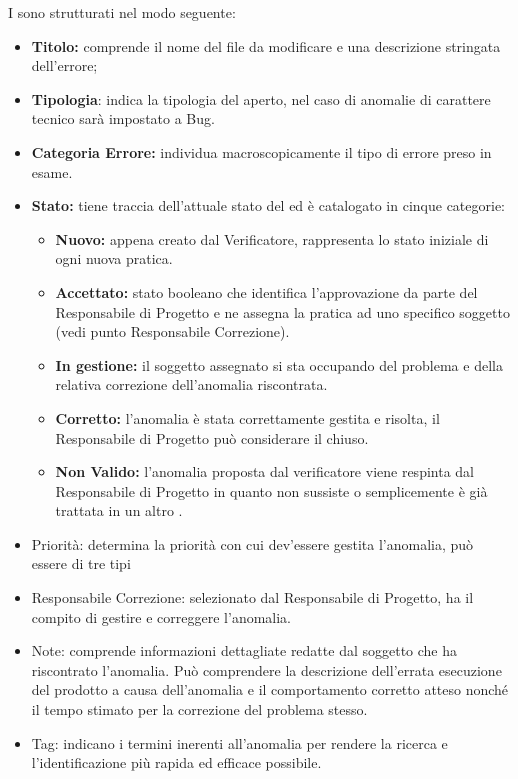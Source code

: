 I  sono strutturati nel modo seguente:
\begin{itemize}
\item \textbf{Titolo:} comprende il nome del file da modificare e una descrizione stringata dell'errore;
\item \textbf{Tipologia}: indica la tipologia del  aperto, nel caso di anomalie di carattere tecnico sarà impostato a Bug.
\item \textbf{Categoria Errore:} individua macroscopicamente il tipo di errore preso in esame.
\item \textbf{Stato:} tiene traccia dell'attuale stato del  ed è catalogato in cinque categorie:
\begin{itemize}
\item \textbf{Nuovo:}  appena creato dal Verificatore, rappresenta lo stato iniziale di ogni nuova pratica.
\item \textbf{Accettato:} stato booleano che identifica l'approvazione da parte del Responsabile di Progetto e ne assegna la pratica ad uno specifico soggetto (vedi punto Responsabile Correzione).
\item \textbf{In gestione:} il soggetto assegnato si sta occupando del problema e della relativa correzione dell'anomalia riscontrata.
\item \textbf{Corretto:} l'anomalia è stata correttamente gestita e risolta, il Responsabile di Progetto può considerare il  chiuso.
\item \textbf{Non Valido:} l'anomalia proposta dal verificatore viene respinta dal Responsabile di Progetto in quanto non sussiste o semplicemente è già trattata in un altro .
\end{itemize}
\item Priorità: determina la priorità con cui dev'essere gestita l'anomalia, può essere di tre tipi
\item Responsabile Correzione: selezionato dal Responsabile di Progetto, ha il compito di gestire e correggere l'anomalia.
\item Note: comprende informazioni dettagliate redatte dal soggetto che ha riscontrato l'anomalia. Può comprendere la descrizione dell'errata esecuzione del prodotto a causa dell'anomalia e il comportamento corretto atteso nonché il tempo stimato per la correzione del problema stesso. 
\item Tag: indicano i termini inerenti all'anomalia per rendere la ricerca e l'identificazione più rapida ed efficace possibile.
\end{itemize}

